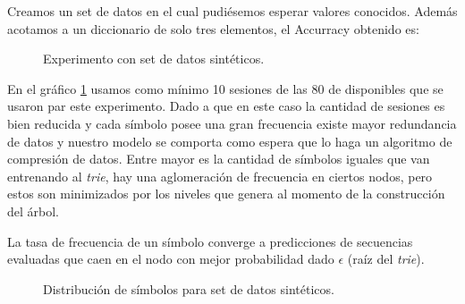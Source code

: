 
	Creamos un set de datos en el cual pudiésemos esperar valores conocidos. Además acotamos a un diccionario de solo tres elementos, el Accurracy obtenido es:
	
	
	
	\begin{figure}[h] 
		\centering
		\caption{Experimento con set de datos sintéticos.}
		\label{fig:graph-exp1}
	\end{figure}
	

	
 
	
	En el gráfico \ref{fig:graph-exp1} usamos como mínimo 10 sesiones de las 80 de disponibles que se usaron par este experimento. Dado a que en este caso la cantidad de sesiones es bien reducida y cada símbolo posee una gran frecuencia existe mayor redundancia de datos y nuestro modelo se comporta como espera que lo haga un algoritmo de compresión de datos. Entre mayor es la cantidad de símbolos iguales
	que van entrenando al \emph{trie}, hay una aglomeración de frecuencia en ciertos nodos, pero estos son minimizados por los niveles que genera al momento de la construcción del árbol.
	
	La tasa de frecuencia de un símbolo converge a predicciones de secuencias evaluadas que caen en el nodo con mejor probabilidad dado $\epsilon$ (raíz del \emph{trie}).
	



	
   \begin{figure}[h] 
	   \centering
		\caption{Distribución de símbolos para set de datos sintéticos.}
		\label{fig:bar-chart-data-sintetica}
	\end{figure}


